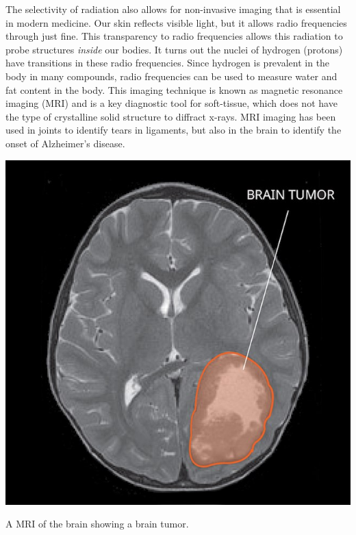 The selectivity of radiation also allows for non-invasive imaging that is essential in modern medicine. Our skin reflects visible light, but it allows radio frequencies through just fine. This transparency to radio frequencies allows this radiation to probe structures \textit{inside} our bodies. It turns out the nuclei of hydrogen (protons) have transitions in these radio frequencies. Since hydrogen is prevalent in the body in many compounds, radio frequencies can be used to measure water and fat content in the body. This imaging technique is known as magnetic resonance imaging (MRI) and is a key diagnostic tool for soft-tissue, which does not have the type of crystalline solid structure to diffract x-rays. MRI imaging has been used in joints to identify tears in ligaments, but also in the brain to identify the onset of Alzheimer's disease. 


\begin{marginfigure}[0cm]
	\includegraphics{images/brain_mri.jpg}
	\caption{A MRI of the brain showing a brain tumor.} 
\end{marginfigure}


